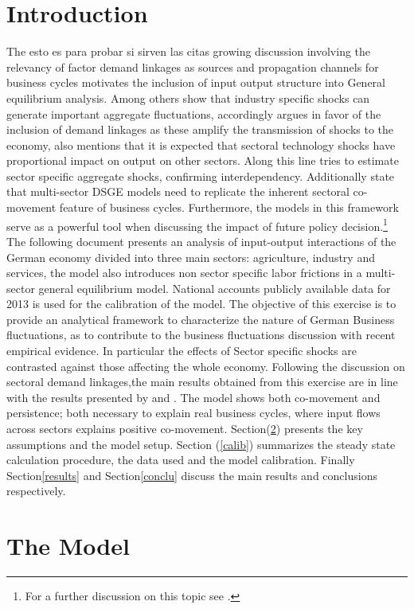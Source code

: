 \section{Introduction}
The esto es para probar si sirven las citas \cite{acemo} growing discussion involving the relevancy of factor demand linkages as sources and propagation channels for business cycles motivates the inclusion of input output structure into General equilibrium analysis. Among others \cite{acemo} show that industry specific shocks can generate important aggregate fluctuations, accordingly \cite{horvath} argues in favor of the inclusion of demand linkages as these amplify the transmission of shocks to the economy, \cite{horvath} also mentions that it is expected that sectoral technology shocks have proportional impact on output on other sectors. Along this line \cite{atalay} tries to estimate sector specific aggregate shocks, confirming interdependency. Additionally \cite{santoro} state that multi-sector DSGE models need to replicate the inherent sectoral co-movement feature of business cycles. 
Furthermore, the models in this framework serve as a powerful tool when discussing the impact of future policy decision.\footnote{For a further discussion on this topic see \cite{santoro}.}
The following document presents an analysis of input-output interactions of the German economy divided into three main sectors: agriculture, industry and services, the model also introduces non sector specific labor frictions in a multi-sector general equilibrium model. National accounts publicly available data for 2013 is used for the calibration of the model. 
The objective of this exercise is to provide an analytical framework to characterize the nature of German Business fluctuations, as to contribute to the business fluctuations discussion with recent empirical evidence. In particular the effects of Sector specific shocks are contrasted against those affecting the whole economy. Following the discussion on sectoral demand linkages,the main results obtained from this exercise are in line with the results presented by \cite{long} and \cite{horvath}. The model shows both co-movement and persistence; both necessary to explain real business cycles, where input flows across sectors explains positive co-movement.  
Section(\ref{model}) presents the key assumptions and the model setup. Section (\ref{calib}) summarizes the steady state calculation procedure, the data used and the model calibration. Finally Section\ref{results} and Section\ref{conclu} discuss the main results and conclusions respectively.
\section{The Model} \label{model}
